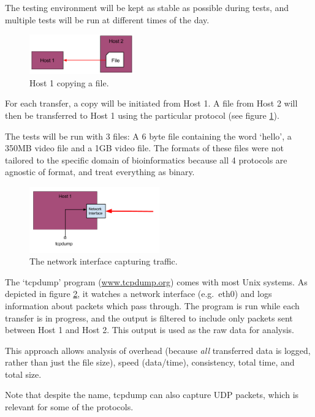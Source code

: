 \documentclass{sig-alternate-05-2015}
\begin{document}
The testing environment will be kept as stable as possible during tests, and multiple tests will be run at different times of the day.

\begin{figure}[H]
	\centering
	\includegraphics[width=0.4\textwidth]{img/basic_transfer_example.png}
	\caption{Host 1 copying a file.
	         \label{fig:copy_example}}
\end{figure}
For each transfer, a copy will be initiated from Host 1. A file from Host 2 will then be transferred to Host 1 using the particular protocol (see figure \ref{fig:copy_example}).

The tests will be run with 3 files: A 6 byte file containing the word `hello', a 350MB video file and a 1GB video file. The formats of these files were not tailored to the specific domain of bioinformatics because all 4 protocols are agnostic of format, and treat everything as binary.

\begin{figure}[H]
	\centering
	\includegraphics[width=0.5\textwidth]{img/if_example.png}
	\caption{The network interface capturing traffic.
             \label{fig:interface_example}}
\end{figure}
The `tcpdump' program (\url{www.tcpdump.org}) comes with most Unix systems. As depicted in figure \ref{fig:interface_example}, it watches a network interface (e.g.\ eth0) and logs information about packets which pass through. The program is run while each transfer is in progress, and the output is filtered to include only packets sent between Host 1 and Host 2. This output is used as the raw data for analysis.

This approach allows analysis of overhead (because \textit{all} transferred data is logged, rather than just the file size), speed (data/time), consistency, total time, and total size.

Note that despite the name, tcpdump can also capture UDP packets, which is relevant for some of the protocols.
\end{document}
